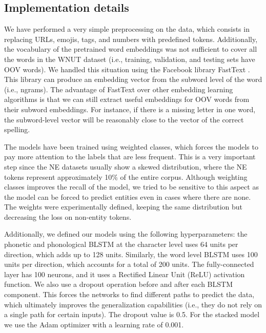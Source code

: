 \documentclass[11pt,a4paper]{article}
\begin{document}
\subsection{Implementation details}

We have performed a very simple preprocessing on the data, which consists in replacing URLs, emojis, tags, and numbers with predefined tokens. Additionally, the vocabulary of the pretrained word embeddings was not sufficient to cover all the words in the WNUT dataset (i.e., training, validation, and testing sets have OOV words). We handled this situation using the Facebook library FastText \citep{bojanowski2016enriching}. 
This library can produce an embedding vector from the subword level of the word (i.e., ngrams). The advantage of FastText over other embedding learning algorithms is that we can still extract useful embeddings for OOV words from their subword embeddings. For instance, if there is a missing letter in one word, the subword-level vector will be reasonably close to the vector of the correct spelling.

The models have been trained using weighted classes, which forces the models to pay more attention to the labels that are less frequent. This is a very important step since the NE datasets usually show a skewed distribution, where the NE tokens represent approximately 10\% of the entire corpus. Although weighting classes improves the recall of the model, we tried to be sensitive to this aspect as the model can be forced to predict entities even in cases where there are none. The weights were experimentally defined, keeping the same distribution but decreasing the loss on non-entity tokens. 

Additionally, we defined our models using the following hyperparameters: the phonetic and phonological BLSTM at the character level uses 64 units per direction, which adds up to 128 units. Similarly, the word level BLSTM uses 100 units per direction, which accounts for a total of 200 units. The fully-connected layer has 100 neurons, and it uses a Rectified Linear Unit (ReLU) activation function. We also use a dropout operation before and after each BLSTM component. This forces the networks to find different paths to predict the data, which ultimately improves the generalization capabilities (i.e., they do not rely on a single path for certain inputs). The dropout value is 0.5. For the stacked model we use the Adam optimizer \citep{DBLP:journals/corr/KingmaB14} with a learning rate of 0.001.
\end{document}
